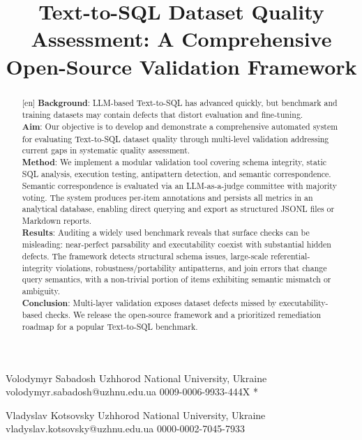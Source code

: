 \documentclass[print]{einformatica}
\begin{document}
\title{Text-to-SQL Dataset Quality Assessment: A Comprehensive Open-Source Validation Framework}



\EIauthorI
   {Volodymyr}
   {Sabadosh}
   {Uzhhorod National University, Ukraine}
   {volodymyr.sabadosh@uzhnu.edu.ua}
   {0009-0006-9933-444X}
   {*} %

\EIauthorII
   {Vladyslav}
   {Kotsovsky}
   {Uzhhorod National University, Ukraine}
   {vladyslav.kotsovsky@uzhnu.edu.ua}
   {0000-0002-7045-7933}
   {} %
 

\begin{abstract}[en]
\textbf{Background}: 
LLM-based Text-to-SQL has advanced quickly, but benchmark and training datasets may contain defects that distort evaluation and fine-tuning. \\
\textbf{Aim}: 
Our objective is to develop and demonstrate a comprehensive automated system for evaluating Text-to-SQL dataset quality through multi-level validation addressing current gaps in systematic quality assessment. \\
\textbf{Method}: 
We implement a modular validation tool covering schema integrity, static SQL analysis, execution testing, antipattern detection, and semantic correspondence. Semantic correspondence is evaluated via an LLM-as-a-judge committee with majority voting. The system produces per-item annotations and persists all metrics in an analytical database, enabling direct querying and export as structured JSONL files or Markdown reports. \\
\textbf{Results}:
Auditing a widely used benchmark reveals that surface checks can be misleading: near-perfect parsability and executability coexist with substantial hidden defects. The framework detects structural schema issues, large-scale referential-integrity violations, robustness/portability antipatterns, and join errors that change query semantics, with a non-trivial portion of items exhibiting semantic mismatch or ambiguity. \\
\textbf{Conclusion}:
Multi-layer validation exposes dataset defects missed by executability-based checks. We release the open-source framework and a prioritized remediation roadmap for a popular Text-to-SQL benchmark.
\end{abstract}
\end{document}
